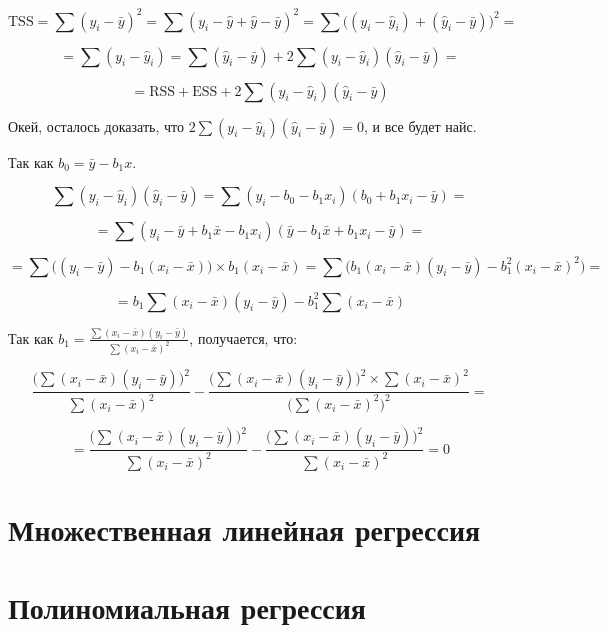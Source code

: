 \documentclass[
  letterpaper,
]{scrbook}
\theoremstyle{definition}
\theoremstyle{remark}
\begin{document}
\[
\mathrm{TSS} = 
\sum (y_i - \bar y)^2 = 
\sum (y_i - \hat y + \hat y - \bar y)^2 = 
\sum \big( (y_i - \hat y_i) + (\hat y_i - \bar y) \big)^2 = 
\]

\[
= \sum (y_i - \hat y_i) = \sum (\hat y_i - \bar y) + 2 \sum (y_i - \hat y_i)(\hat y_i - \bar y) = 
\]

\[
= \mathrm{RSS} + \mathrm{ESS} + 2 \sum (y_i - \hat y_i)(\hat y_i - \bar y)
\]

Окей, осталось доказать, что
\(2 \sum (y_i - \hat y_i)(\hat y_i - \bar y) = 0\), и все будет найс.

Так как \(b_0 = \bar y - b_1 x\).

\[
\sum (y_i - \hat y_i)(\hat y_i - \bar y) = \sum (y_i - b_0 - b_1 x_i) (b_0 + b_1 x_i - \bar y) =
\]

\[
= \sum (y_i - \bar y + b_1 \bar x - b_1x_i) (\bar y - b_1 \bar x + b_1 x_i - \bar y) =
\]

\[
= \sum \big( (y_i - \bar y) - b_1(x_i - \bar x) \big) \times b_1 (x_i - \bar x) = 
\sum \big( b_1 (x_i - \bar x) (y_i - \bar y) - b_1^2 (x_i - \bar x)^2 \big) = 
\]

\[
= b_1 \sum (x_i - \bar x) (y_i - \bar y) - b_1^2 \sum (x_i - \bar x)
\]

Так как
\(b_1 = \frac{\sum(x_i - \bar x)(y_i - \bar y)}{\sum (x_i - \bar x)^2}\),
получается, что:

\[
\frac{\Big( \sum (x_i - \bar x) (y_i - \bar y) \Big)^2}{\sum (x_i - \bar x)^2} - \frac{\Big( \sum (x_i - \bar x) (y_i - \bar y) \Big)^2 \times \sum (x_i - \bar x)^2}{\Big( \sum (x_i - \bar x)^2\Big)^2} = 
\]

\[
= \frac{\Big( \sum (x_i - \bar x) (y_i - \bar y) \Big)^2}{\sum (x_i - \bar x)^2} - \frac{\Big( \sum (x_i - \bar x) (y_i - \bar y) \Big)^2}{\sum (x_i - \bar x)^2} = 0
\]


\chapter{Множественная линейная регрессия}\label{andan-multiplelinear}


\chapter{Полиномиальная регрессия}\label{andan-polynomial}

\end{document}

